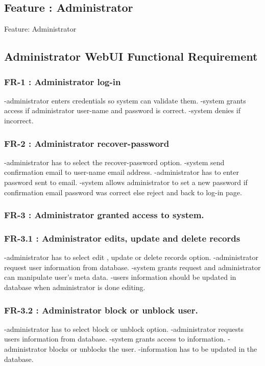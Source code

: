 \begin{Requirements}
\section{Feature : Administrator}
Feature:  Administrator 
\subsection{Administrator WebUI Functional Requirement}

\subsubsection{FR-1  : Administrator log-in}
	  	-administrator enters credentials so system can validate them.
	 	-system grants access if administrator user-name and password is correct.
	 	-system denies if incorrect.
	  
\subsubsection{FR-2   : Administrator recover-password}
		-administrator has to select the recover-password option.
		-system send confirmation email to user-name email address.
		-administrator has to enter password sent to email.
	  	-system allows administrator to set a new password if confirmation email password was correct else reject and back to 			 log-in page.
\subsubsection{FR-3   :	Administrator granted access to system.}
  	
\subsubsection{FR-3.1 :	Administrator edits, update and delete records}
		-administrator has to select edit , update or delete records option.
		-administrator request user information from database.
		-system grants request and administrator can manipulate user's meta data.
		-users information should be updated in database when administrator is done editing.
		
\subsubsection{FR-3.2 :	Administrator block or unblock user.}
		-administrator has to select block or unblock option.
		-administrator requests users information from database.
		-system grants access to information.
		-administrator blocks or unblocks the user.
		-information has to be updated in the database.
		

\end{Requirements}
